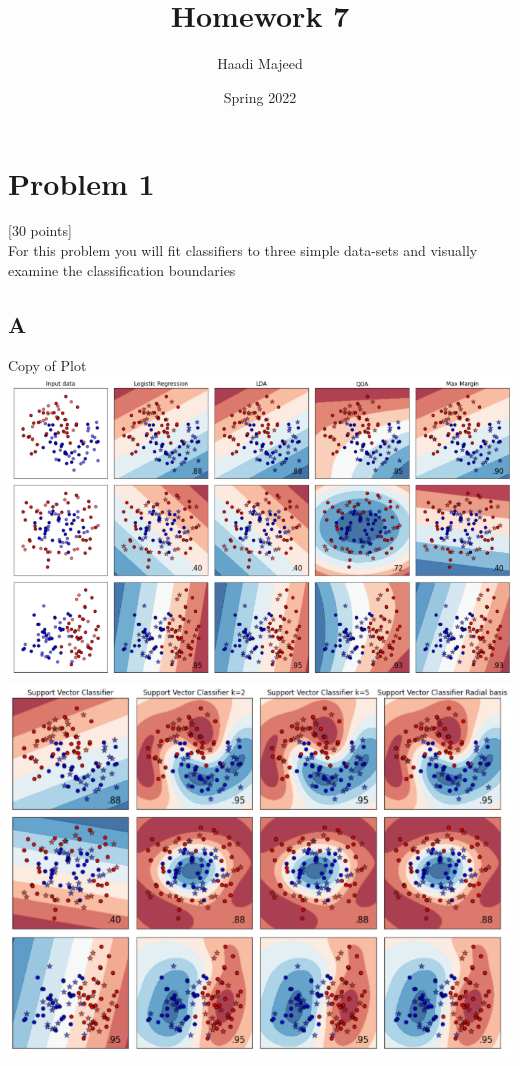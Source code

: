 \documentclass[12pt]{article}
\title{ \course \\\large Homework 7 }
\author{ Haadi Majeed }
\date{Spring 2022}
\begin{document}
\maketitle
\pagebreak

\pagebreak
\section{Problem 1}
 [30 points]\\
For this problem you will fit classifiers to three simple data-sets and visually examine the classification boundaries\\
\subsection{A}
Copy of Plot\\
\includegraphics[width=1\textwidth]{p1.a.1.png}
\includegraphics[width=1\textwidth]{p1.a.2.png}
\end{document}

